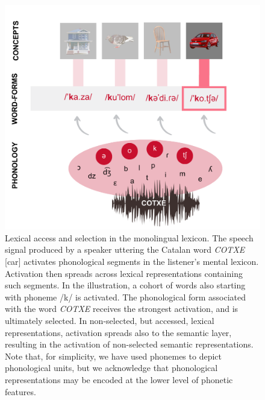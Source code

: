 \documentclass[
  12pt,
  b5paperpaper,
  twoside]{scrreprt}
\begin{document}
\begin{figure}

{\centering \includegraphics{chapters/../_assets/img/lexicon-mon.png}

}

\caption{\label{fig-lexicon-mon}Lexical access and selection in the
monolingual lexicon. The speech signal produced by a speaker uttering
the Catalan word \emph{COTXE} {[}car{]} activates phonological segments
in the listener's mental lexicon. Activation then spreads across lexical
representations containing such segments. In the illustration, a cohort
of words also starting with phoneme /k/ is activated. The phonological
form associated with the word \emph{COTXE} receives the strongest
activation, and is ultimately selected. In non-selected, but accessed,
lexical representations, activation spreads also to the semantic layer,
resulting in the activation of non-selected semantic representations.
Note that, for simplicity, we have used phonemes to depict phonological
units, but we acknowledge that phonological representations may be
encoded at the lower level of phonetic features.}

\end{figure}
\end{document}
